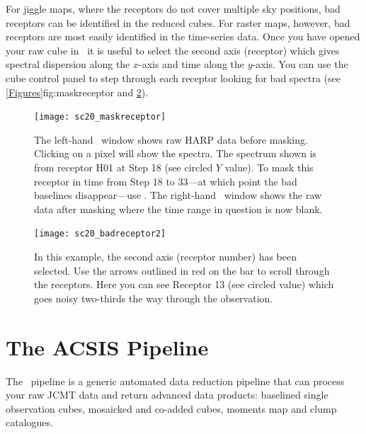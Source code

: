\documentclass[11pt,oneside,chapters]{starlink}
\begin{document}
For jiggle maps, where the receptors do not cover multiple sky
positions, bad receptors can be identified in the reduced cubes. For
raster maps, however, bad receptors are most easily identified in the
time-series data. Once you have opened your raw cube in \gaia\ it is
useful to select the second axis (receptor) which gives spectral
dispersion along the $x$-axis and time along the $y$-axis. You can use
the cube control panel to step through each receptor looking for bad
spectra (see \cref{Figures}{fig:maskreceptor}{} and
\ref{fig:maskreceptor2}).

\begin{figure}[h!]
\begin{center}
\texttt{[image: sc20\_maskreceptor]}
\caption[Identifying bad receptors in the raw data.]{\label{fig:maskreceptor}
  The left-hand \gaia\ window shows raw HARP data before masking.
  Clicking on a pixel will show the spectra. The spectrum shown is from
  receptor H01 at Step 18 (see circled $Y$ value). To mask this receptor
  in time from Step 18 to 33---at which point the bad baselines
  disappear---use \chpix. The right-hand \gaia\ window shows the raw
  data after masking where the time range in question is now blank.}
\end{center}
\end{figure}

\begin{figure}[h!]
\begin{center}
\texttt{[image: sc20\_badreceptor2]}
\caption[Identifying bad receptors in the raw data: second method.]{\label{fig:maskreceptor2}
  In this example, the second axis (receptor number) has been
  selected. Use the arrows outlined in red on the  bar to scroll through the receptors. Here you can see
  Receptor 13 (see circled  value) which
  goes noisy two-thirds the way through the observation.}
\end{center}
\end{figure}


\newpage
\chapter{The ACSIS Pipeline}
\label{sec:pipe}

The \ORACDR\ pipeline \cite{oracdr} is a generic automated data
reduction pipeline that can process your raw JCMT data and return
advanced data products: baselined single observation cubes, mosaicked
and co-added cubes, moments map and clump catalogues.
\cite{heterodyne_pipeline}
\end{document}
